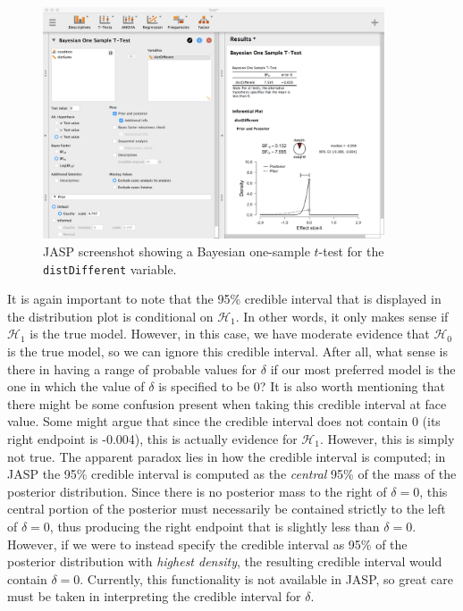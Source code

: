 \documentclass[english,,doc,floatsintext]{apa6}
\begin{document}
\begin{figure}
\centering
\includegraphics[width=0.9\textwidth,height=\textheight]{figures/ttestBayes2.png}
\caption{\label{fig:ttestBayes2}JASP screenshot showing a Bayesian one-sample \(t\)-test for the \texttt{distDifferent} variable.}
\end{figure}

It is again important to note that the 95\% credible interval that is displayed in the distribution plot is conditional on \(\mathcal{H}_{1}\). In other words, it only makes sense if \(\mathcal{H}_{1}\) is the true model. However, in this case, we have moderate evidence that \(\mathcal{H}_{0}\) is the true model, so we can ignore this credible interval. After all, what sense is there in having a range of probable values for \(\delta\) if our most preferred model is the one in which the value of \(\delta\) is specified to be 0? It is also worth mentioning that there might be some confusion present when taking this credible interval at face value. Some might argue that since the credible interval does not contain 0 (its right endpoint is -0.004), this is actually evidence for \(\mathcal{H}_{1}\). However, this is simply not true. The apparent paradox lies in how the credible interval is computed; in JASP the 95\% credible interval is computed as the \emph{central} 95\% of the mass of the posterior distribution. Since there is no posterior mass to the right of \(\delta=0\), this central portion of the posterior must necessarily be contained strictly to the left of \(\delta=0\), thus producing the right endpoint that is slightly less than \(\delta=0\). However, if we were to instead specify the credible interval as 95\% of the posterior distribution with \emph{highest density}, the resulting credible interval would contain \(\delta=0\). Currently, this functionality is not available in JASP, so great care must be taken in interpreting the credible interval for \(\delta\).
\end{document}
